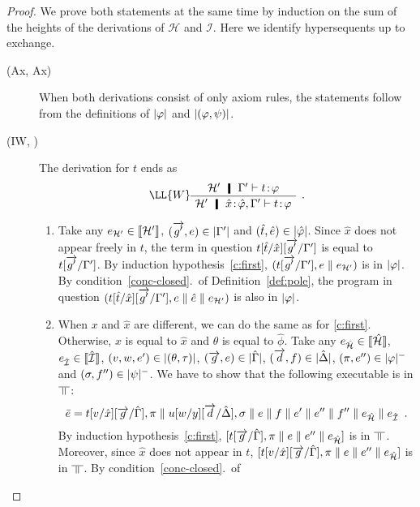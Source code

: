 \begin{proof}
 We prove both statements at the same time by induction on the sum of
 the heights of the derivations of $\mathcal H$ and $\mathcal I$.  Here
 we identify hypersequents up to exchange.
  \begin{description}
  \item[(Ax, Ax)] When both derivations consist of only axiom rules,
       the statements follow from the definitions of $|{\varphi}|$ and
       $|{(\varphi,\psi)}|$.
   \item[(IW, \textminus)]
	The derivation for $t$ ends as
	\[
	 \aseq{\hyp'\G'}{\tj{t}{\phi}}
	\LL{W}
	\useq{\hyp'\tj{\hat{x}}{\hat{\phi}}, \G'}{\tj{t}{\phi}}
	\DisplayProof\enspace.
	\]
	\begin{enumerate}[label=\textit{(\arabic{*})}]
	 \item Take any
	       $e_{\mathcal{H'}}\in \llbracket{\mathcal{H'}}\rrbracket$,
	       $(\overrightarrow{g'}, e)\in|{\Gamma'}|$ and $(\hat t,\hat
	       e)\in|{\hat{\varphi}}|$.
	       Since $\hat x$ does not appear freely in $t$,
	       the term in question $t[\hat t/\hat x][\overrightarrow{g'}/\Gamma']$ is
	       equal to $t[\overrightarrow{g'}/\Gamma']$.
	       By induction hypothesis~\ref{c:first},
	       $(t[\overrightarrow{g'}/\Gamma'],e\parallel e_{\mathcal H'})$ is in $|{\varphi}|$.
	       By condition~\ref{conc-closed}.~of Definition~\ref{def:pole},
	       the program in question $(t[\hat t/\hat x][\overrightarrow{g'}/\Gamma'],
	       e\parallel \hat e\parallel e_{\mathcal H'})$ is also in $|{\varphi}|$.
	 \item
	       When $x$ and $\hat x$ are different, we can do the same
	      as for \ref{c:first}.
	      Otherwise, $x$ is equal to $\hat x$ and $\theta$ is equal
	      to $\hat\phi$.
	      Take any
	      $e_{\hat{\mathcal{H}}}\in \llbracket{\hat{\mathcal{H}}}\rrbracket$,
	      $e_{\hat{\mathcal{I}}}\in \llbracket{\hat{\mathcal{I}}}\rrbracket$,
	      $(v,w,e')\in|{(\theta,\tau)}|$,
	      $(\overrightarrow g,e)\in|{\hat{\Gamma}}|$,
	      $(\overrightarrow d,f)\in|{\hat{\Delta}}|$,
	      $(\pi,e'')\in|{\varphi}|^-$ and
	      $(\sigma,f'')\in|{\psi}|^-$.
	      We have to show that the following executable is in
	      $\bbot$:
	      \[
	       \bar e = t[v/\hat x][\overrightarrow{g}/\hat{\Gamma}],\pi\parallel
	      u[w/y][\overrightarrow d/\hat {\Delta}], \sigma\parallel e\parallel f\parallel e'\parallel
	      e''\parallel f''\parallel e_{\hat{\mathcal{H}}}\parallel e_{\hat{\mathcal{I}}}\enspace.
	      \]
	      By induction hypothesis~\ref{c:first},
	      $
	       [t[\overrightarrow g/\hat {\Gamma}],\pi\parallel e\parallel e''\parallel e_{\hat{\mathcal{H}}}]
	      $
	      is in $\bbot$.  Moreover, since $\hat x$ does not appear
	      in $t$,  $[t[v/\hat x][\overrightarrow g/\hat {\Gamma}],\pi\parallel e\parallel
	      e''\parallel e_{\hat{\mathcal{H}}}]$
	      is in $\bbot$.  By condition~\ref{conc-closed}.~of

\end{enumerate}
\end{description}
\end{proof}
